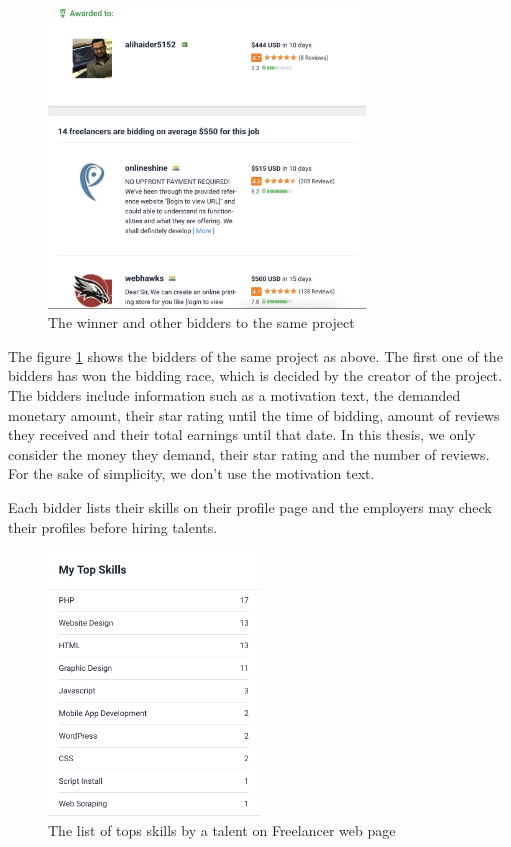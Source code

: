 \begin{figure}[h]
	\centering
	\includegraphics[width=0.75\textwidth]{figures/FreelancerTalentExample.png}
	\caption{The winner and other bidders to the same project}
	\label{fig:freelancer-example-talent}
\end{figure}


The figure \ref{fig:freelancer-example-talent} shows the bidders of the same project as above. The first one of the bidders has won the bidding race, which is decided by the creator of the project. The bidders include information such as a motivation text, the demanded monetary amount, their star rating until the time of bidding, amount of reviews they received and their total earnings until that date. In this thesis, we only consider the money they demand, their star rating and the number of reviews. For the sake of simplicity, we don't use the motivation text.


Each bidder lists their skills on their profile page and the employers may check their profiles before hiring talents. 

\begin{figure}[h]
	\centering
	\includegraphics[width=0.5\textwidth]{figures/FreelancerTalentSkills.png}
	\caption{The list of tops skills by a talent on Freelancer web page}
	\label{fig:freelancer-talent-skills}
\end{figure}





